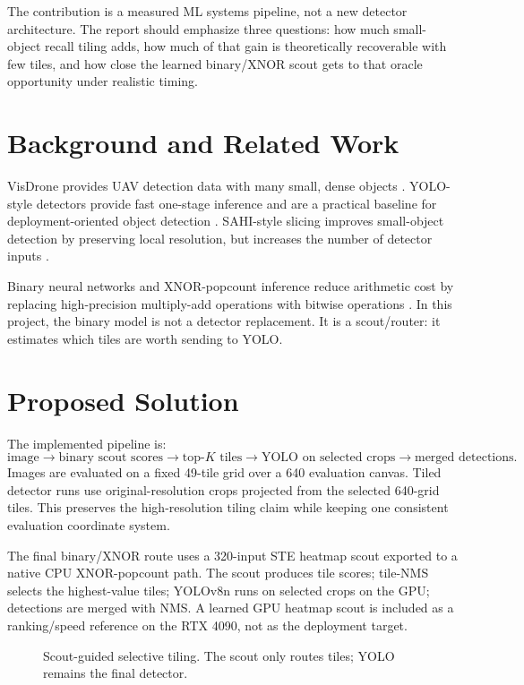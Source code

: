 \documentclass[conference]{IEEEtran}
\begin{document}
The contribution is a measured ML systems pipeline, not a new detector architecture. The report should emphasize three questions: how much small-object recall tiling adds, how much of that gain is theoretically recoverable with few tiles, and how close the learned binary/XNOR scout gets to that oracle opportunity under realistic timing.

\section{Background and Related Work}
VisDrone provides UAV detection data with many small, dense objects \cite{zhu2020visdrone}. YOLO-style detectors provide fast one-stage inference and are a practical baseline for deployment-oriented object detection \cite{ultralyticsYoloDocs}. SAHI-style slicing improves small-object detection by preserving local resolution, but increases the number of detector inputs \cite{akyon2022sahi}.

Binary neural networks and XNOR-popcount inference reduce arithmetic cost by replacing high-precision multiply-add operations with bitwise operations \cite{rastegari2016xnor}. In this project, the binary model is not a detector replacement. It is a scout/router: it estimates which tiles are worth sending to YOLO.

\section{Proposed Solution}
The implemented pipeline is:
\[
\text{image} \rightarrow \text{binary scout scores} \rightarrow \text{top-}K\text{ tiles}
\rightarrow \text{YOLO on selected crops} \rightarrow \text{merged detections}.
\]
Images are evaluated on a fixed 49-tile grid over a 640 evaluation canvas. Tiled detector runs use original-resolution crops projected from the selected 640-grid tiles. This preserves the high-resolution tiling claim while keeping one consistent evaluation coordinate system.

The final binary/XNOR route uses a 320-input STE heatmap scout exported to a native CPU XNOR-popcount path. The scout produces tile scores; tile-NMS selects the highest-value tiles; YOLOv8n runs on selected crops on the GPU; detections are merged with NMS. A learned GPU heatmap scout is included as a ranking/speed reference on the RTX 4090, not as the deployment target.

\begin{figure}[t]
\centering
{}
\caption{Scout-guided selective tiling. The scout only routes tiles; YOLO remains the final detector.}
\label{fig:pipeline}
\end{figure}
\end{document}
